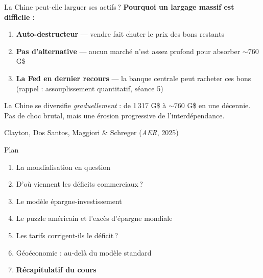 \documentclass[aspectratio=169]{beamer}
\begin{document}
\begin{frame}[t]{La Chine peut-elle larguer ses actifs\,?}
   \small
   \vspace{0.2cm}
   \textbf{Pourquoi un largage massif est difficile :}
   \vspace{0.15cm}
   \begin{enumerate}
      \setlength\itemsep{0.2cm}
      \item \textbf{Auto-destructeur} --- vendre fait chuter le prix des bons restants
      \item \textbf{Pas d'alternative} --- aucun marché n'est assez profond pour absorber $\sim$760 G\$
      \item \textbf{La Fed en dernier recours} --- la banque centrale peut racheter ces bons (rappel : assouplissement quantitatif, séance 5)
   \end{enumerate}
   \vspace{0.2cm}
   \begin{warning}
      \footnotesize
      La Chine se diversifie \textit{graduellement} : de 1\,317 G\$ à $\sim$760 G\$ en une décennie. Pas de choc brutal, mais une érosion progressive de l'interdépendance.
   \end{warning}
   \mbox{}\hfill{\scriptsize\textcolor{HECgray}{Clayton, Dos Santos, Maggiori \& Schreger (\textit{AER}, 2025)}}
\end{frame}


\begin{frame}{Plan}
   \begin{enumerate}
      \setlength\itemsep{0.4cm}
      \item {\color{gray!50}La mondialisation en question}
      \item {\color{gray!50}D'où viennent les déficits commerciaux\,?}
      \item {\color{gray!50}Le modèle épargne-investissement}
      \item {\color{gray!50}Le puzzle américain et l'excès d'épargne mondiale}
      \item {\color{gray!50}Les tarifs corrigent-ils le déficit\,?}
      \item {\color{gray!50}Géoéconomie : au-delà du modèle standard}
      \item \textbf{Récapitulatif du cours}
   \end{enumerate}
\end{frame}
\end{document}
